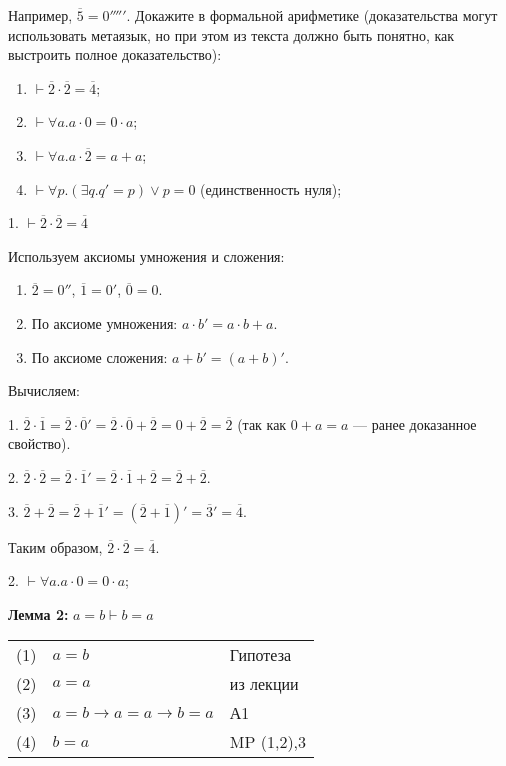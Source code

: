 Например, $\overline{5} = 0'''''$. Докажите в формальной арифметике (доказательства могут использовать
метаязык, но при этом из текста должно быть понятно, как выстроить полное доказательство):
\begin{enumerate}
\item $\vdash \overline{2} \cdot \overline{2} = \overline{4}$;

\item $\vdash \forall a.a \cdot 0 = 0 \cdot a$;
\item $\vdash \forall a.a \cdot \overline{2} = a + a$;
\item $\vdash \forall p.(\exists q.q' = p) \vee p = 0$ (единственность нуля);
\end{enumerate}


1. $\vdash \overline{2} \cdot \overline{2} = \overline{4}$

Используем аксиомы умножения и сложения:
\begin{enumerate}
    \item $\overline{2} = 0''$, $\overline{1} = 0'$, $\overline{0} = 0$.
    \item По аксиоме умножения: $a \cdot b' = a \cdot b + a$.
    \item По аксиоме сложения: $a + b' = (a + b)'$.
\end{enumerate}

Вычисляем:

1. $\overline{2} \cdot \overline{1} = \overline{2} \cdot \overline{0}' = \overline{2} \cdot \overline{0} + \overline{2} = 0 + \overline{2} = \overline{2}$ (так как $0 + a = a$ — ранее доказанное свойство).

2. $\overline{2} \cdot \overline{2} = \overline{2} \cdot \overline{1}' = \overline{2} \cdot \overline{1} + \overline{2} = \overline{2} + \overline{2}$.

3. $\overline{2} + \overline{2} = \overline{2} + \overline{1}' = (\overline{2} + \overline{1})' = \overline{3}' = \overline{4}$.

Таким образом, $\overline{2} \cdot \overline{2} = \overline{4}$. 

2. $\vdash \forall a.a \cdot 0 = 0 \cdot a$;

\textbf{Лемма 2:} $ a = b \vdash b = a$

\begin{tabular}{lll}
     (1)&$a =b $& Гипотеза \\
     (2)&$a =a $& из лекции \\
     (3)&$a =b \rightarrow a = a \rightarrow b = a $& А1 \\
     (4)&$b= a$ & MP (1,2),3
\end{tabular}

